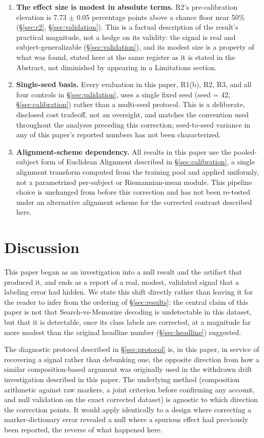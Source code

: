 \documentclass[preprint,12pt]{elsarticle}
\begin{document}
\begin{enumerate}
\item \textbf{The effect size is modest in absolute terms.} R2's pre-calibration elevation is 7.73 $\pm$ 0.05 percentage points above a chance floor near 50\% (\S\ref{sec:r2}, \S\ref{sec:validation}). This is a factual description of the result's practical magnitude, not a hedge on its validity: the signal is real and subject-generalizable (\S\ref{sec:validation}), and its modest size is a property of what was found, stated here at the same register as it is stated in the Abstract, not diminished by appearing in a Limitations section.
\item \textbf{Single-seed basis.} Every evaluation in this paper, R1(b), R2, R3, and all four controls in \S\ref{sec:validation}, uses a single fixed seed (seed = 42, \S\ref{sec:calibration}) rather than a multi-seed protocol. This is a deliberate, disclosed cost tradeoff, not an oversight, and matches the convention used throughout the analyses preceding this correction; seed-to-seed variance in any of this paper's reported numbers has not been characterized.
\item \textbf{Alignment-scheme dependency.} All results in this paper use the pooled-subject form of Euclidean Alignment described in \S\ref{sec:calibration}, a single alignment transform computed from the training pool and applied uniformly, not a parametrized per-subject or Riemannian-mean module. This pipeline choice is unchanged from before this correction and has not been re-tested under an alternative alignment scheme for the corrected contrast described here.
\end{enumerate}

\section{Discussion}\label{sec:discussion}

This paper began as an investigation into a null result and the artifact that produced it, and ends as a report of a real, modest, validated signal that a labeling error had hidden. We state this shift directly rather than leaving it for the reader to infer from the ordering of \S\ref{sec:results}: the central claim of this paper is not that Search-vs-Memorize decoding is undetectable in this dataset, but that it is detectable, once its class labels are corrected, at a magnitude far more modest than the original headline number (\S\ref{sec:headline}) suggested.

The diagnostic protocol described in \S\ref{sec:protocol} is, in this paper, in service of recovering a signal rather than debunking one, the opposite direction from how a similar composition-based argument was originally used in the withdrawn drift investigation described in this paper. The underlying method (composition arithmetic against raw markers, a joint criterion before confirming any account, and null validation on the exact corrected dataset) is agnostic to which direction the correction points. It would apply identically to a design where correcting a marker-dictionary error revealed a null where a spurious effect had previously been reported, the reverse of what happened here.
\end{document}
